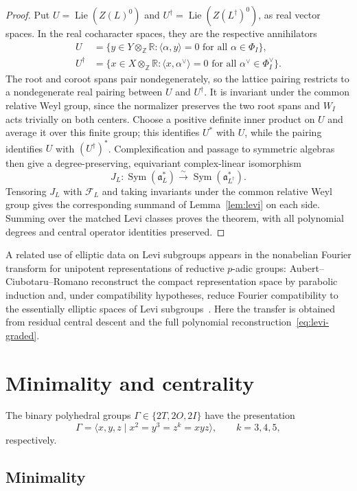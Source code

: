 \documentclass[11pt,a4paper,reqno]{amsart}
\theoremstyle{plain}
\theoremstyle{definition}
\theoremstyle{remark}
\numberwithin{equation}{section}
\DeclareMathOperator{\Lie}{Lie}
\DeclareMathOperator{\Sym}{Sym}
\newcommand{\ZZ}{\mathbb Z}
\newcommand{\RR}{\mathbb R}
\newcommand{\fa}{\mathfrak a}
\newcommand{\pair}[2]{\langle #1,#2\rangle}
\begin{document}
\begin{proof}
Put $U=\Lie(Z(L)^0)$ and $U^\dagger=\Lie(Z(L^\dagger)^0)$, as real vector spaces. In the real cocharacter spaces, they are the respective annihilators
\[
\begin{aligned}
U&=\{y\in Y\otimes_{\ZZ}\RR:\pair{\alpha}{y}=0\text{ for all }\alpha\in\Phi_I\},\\
U^\dagger&=\{x\in X\otimes_{\ZZ}\RR:\pair{x}{\alpha^\vee}=0\text{ for all }\alpha^\vee\in\Phi_I^\vee\}.
\end{aligned}
\]
The root and coroot spans pair nondegenerately, so the lattice pairing restricts to a nondegenerate real pairing between $U$ and $U^\dagger$. It is invariant under the common relative Weyl group, since the normalizer preserves the two root spans and $W_I$ acts trivially on both centers. Choose a positive definite inner product on $U$ and average it over this finite group; this identifies $U^*$ with $U$, while the pairing identifies $U$ with $(U^\dagger)^*$. Complexification and passage to symmetric algebras then give a degree-preserving, equivariant complex-linear isomorphism
\[
J_L\colon\Sym(\fa_L^*)\xrightarrow{\sim}\Sym(\fa_{L^\dagger}^*).
\]
 Tensoring $J_L$ with $\mathcal F_L$ and taking invariants under the common relative Weyl group gives the corresponding summand of Lemma~\ref{lem:levi} on each side. Summing over the matched Levi classes proves the theorem, with all polynomial degrees and central operator identities preserved.
\end{proof}

A related use of elliptic data on Levi subgroups appears in the nonabelian Fourier transform for unipotent representations of reductive $p$-adic groups: Aubert--Ciubotaru--Romano reconstruct the compact representation space by parabolic induction and, under compatibility hypotheses, reduce Fourier compatibility to the essentially elliptic spaces of Levi subgroups~\cite[Theorems~5.2 and~5.16]{ACR}. Here the transfer is obtained from residual central descent and the full polynomial reconstruction~\eqref{eq:levi-graded}.

\section{Minimality and centrality}\label{sec:minima}

The binary polyhedral groups $\Gamma\in\{2T,2O,2I\}$ have the presentation
\[
\Gamma=\langle x,y,z\mid x^2=y^3=z^k=xyz\rangle,
\qquad k=3,4,5,
\]
respectively.

\subsection{Minimality}
\end{document}
